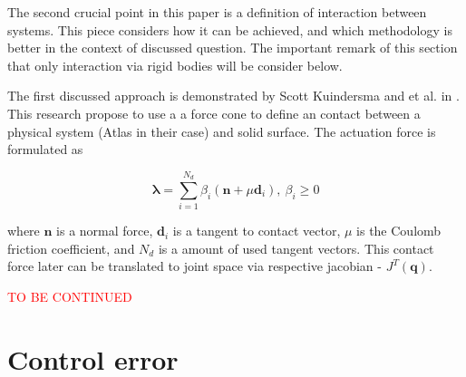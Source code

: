 The second crucial point in this paper is a definition of interaction between 
systems. This piece considers how it can be achieved, and which methodology 
is better in the context of discussed question. The important remark of this 
section that only interaction via rigid bodies will be consider below.

The first discussed approach is demonstrated by Scott Kuindersma and et al. in
\cite{OptimizationBasedLocomotionPlanning}. This research propose to use a 
a force cone to define an contact between a physical system (Atlas in their case) 
and solid surface. The actuation force is formulated as 

\begin{equation}
    \label{eqn:force_cone}
    \pmb{\lambda} = \sum_{i=1}^{N_d} \beta_i (\mathbf{n} + \mu \mathbf{d}_i), 
    \: \beta_i \ge 0
\end{equation}

where $\mathbf{n}$ is a normal force, $\mathbf{d}_i$ is a tangent to contact 
vector, $\mu$ is the Coulomb friction coefficient, and $N_d$ is a amount
of used tangent vectors. This contact force later can be translated to 
joint space via respective jacobian - $J^T(\mathbf{q})$.

\textcolor{red}{TO BE CONTINUED}

\section{Control error} \label{sec:control_error}
